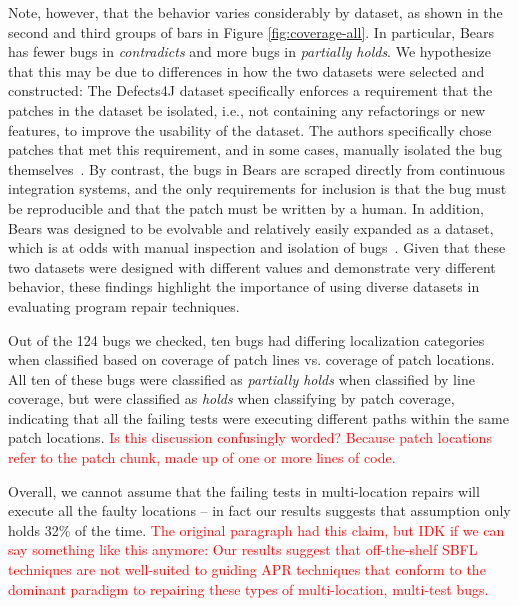 \documentclass[10pt, conference]{IEEEtran}
\newcommand\todo[1]{\textcolor{red}{#1}}
\begin{document}
Note, however, that the behavior varies considerably by dataset, as shown in the second and 
third groups of bars in Figure \ref{fig:coverage-all}. In particular, Bears has fewer bugs in 
\emph{contradicts} and more bugs in 
\emph{partially holds}.
We hypothesize that this may be due to differences in how the two  
datasets were selected and constructed:
The Defects4J dataset specifically enforces a requirement that the patches in the 
dataset be isolated, i.e., not containing any refactorings or new features, to improve the 
usability of the dataset. The authors specifically chose patches that met this requirement, 
and in some cases, manually isolated the bug themselves~\cite{defects4j}. By contrast, the 
bugs in 
Bears are scraped directly from continuous integration systems, and the 
only requirements for inclusion is that the bug must be reproducible and that
the patch must be written by a human. In addition, Bears was designed to be evolvable 
and relatively easily expanded as a dataset, which is at odds with manual inspection and isolation of 
bugs~\cite{bears}.
Given that these two datasets were designed with different values and demonstrate very 
different behavior, these findings highlight the importance of using diverse datasets in 
evaluating program repair techniques.

Out of the 124 bugs we checked, ten bugs had differing localization categories when 
classified based on coverage of patch lines vs. coverage of patch locations. All ten of these 
bugs 
were classified as \emph{partially holds} when classified by line coverage, but were classified as 
\emph{holds} when classifying by patch coverage, indicating that all the failing tests were 
executing different paths within the same patch locations. \todo{Is this discussion confusingly 
worded? Because patch locations refer to the patch chunk, made up of one or more lines of 
code.}

Overall, we cannot assume that the failing tests in multi-location repairs will execute all the 
faulty locations -- in fact our results suggests that assumption only holds 32\% of the time. 
\todo{The original paragraph had this claim, but IDK if we can say something like this anymore:
Our results suggest that off-the-shelf SBFL techniques are not
well-suited to guiding APR techniques that conform to the dominant paradigm to repairing
these types of multi-location, multi-test bugs.}
\end{document}
